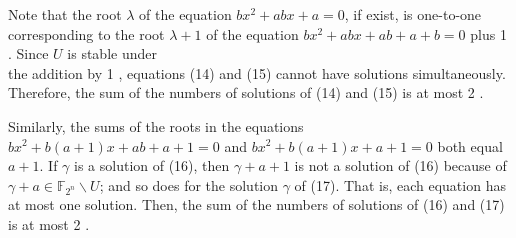 \documentclass[10pt]{article}
\begin{document}
Note that the root $\lambda$ of the equation $b x^{2}+a b x+a=0$, if exist, is one-to-one corresponding to the root $\lambda+1$ of the equation $b x^{2}+a b x+a b+a+b=0$ plus 1 . Since $U$ is stable under\\
the addition by 1 , equations (14) and (15) cannot have solutions simultaneously. Therefore, the sum of the numbers of solutions of (14) and (15) is at most 2 .

Similarly, the sums of the roots in the equations $b x^{2}+b(a+1) x+a b+a+1=0$ and $b x^{2}+b(a+1) x+a+1=0$ both equal $a+1$. If $\gamma$ is a solution of (16), then $\gamma+a+1$ is not a solution of (16) because of $\gamma+a \in \mathbb{F}_{2^{n}} \backslash U$; and so does for the solution $\gamma$ of (17). That is, each equation has at most one solution. Then, the sum of the numbers of solutions of (16) and (17) is at most 2 .
\end{document}
